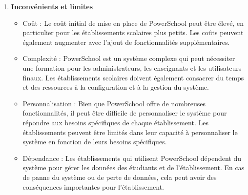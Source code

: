 \begin{enumerate}[label=\alph*]
\begin{itemize}
        \end{itemize}
    \newpage
    \item \textbf{Inconvénients et limites}
        \begin{itemize}
            \item Coût : Le coût initial de mise en place de PowerSchool peut être élevé, en particulier pour les établissements scolaires plus petits. Les coûts peuvent également augmenter avec l'ajout de fonctionnalités supplémentaires.
            \item Complexité : PowerSchool est un système complexe qui peut nécessiter une formation pour les administrateurs, les enseignants et les utilisateurs finaux. Les établissements scolaires doivent également consacrer du temps et des ressources à la configuration et à la gestion du système.
            \item Personnalisation : Bien que PowerSchool offre de nombreuses fonctionnalités, il peut être difficile de personnaliser le système pour répondre aux besoins spécifiques de chaque établissement. Les établissements peuvent être limités dans leur capacité à personnaliser le système en fonction de leurs besoins spécifiques.
            \item Dépendance : Les établissements qui utilisent PowerSchool dépendent du système pour gérer les données des étudiants et de l'établissement. En cas de panne du système ou de perte de données, cela peut avoir des conséquences importantes pour l'établissement.
        \end{itemize}
\end{enumerate}